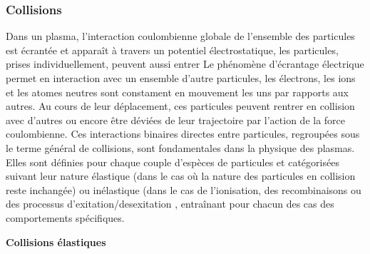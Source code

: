 \subsubsection{Collisions}
Dans un plasma, l'interaction coulombienne globale de l'ensemble des particules est écrantée et apparaît à travers un potentiel
électrostatique, les particules, prises individuellement, peuvent aussi entrer  Le phénomène d'écrantage électrique permet en interaction avec un ensemble d'autre particules, les électrons, les ions et les atomes neutres sont constament en
mouvement les uns par rapports aux autres.
Au cours de leur déplacement, ces particules peuvent rentrer en collision avec d'autres
ou encore être déviées de leur trajectoire par l'action de la force
coulombienne. Ces interactions binaires directes entre particules, regroupées
sous le terme général de collisions, sont fondamentales dans la physique des plasmas.
Elles sont définies pour chaque couple d'espèces de particules et catégorisées suivant
leur nature élastique (dans le cas où la nature des particules en collision
reste inchangée) ou inélastique (dans le cas de l'ionisation, des
recombinaisons ou des processus d'exitation/desexitation , entraînant pour
chacun des cas des comportements spécifiques.




\textbf{Collisions élastiques}

